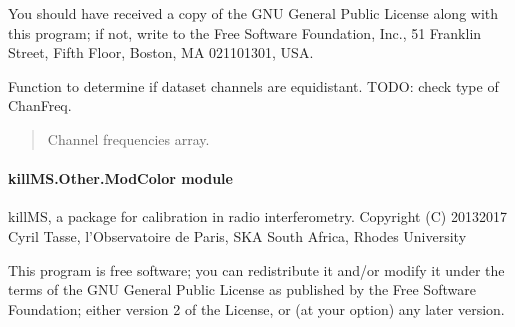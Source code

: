 \documentclass[letterpaper,10pt,english]{sphinxmanual}
\begin{document}
\sphinxAtStartPar
You should have received a copy of the GNU General Public License
along with this program; if not, write to the Free Software
Foundation, Inc., 51 Franklin Street, Fifth Floor, Boston, MA  02110\sphinxhyphen{}1301, USA.

\begin{fulllineitems}
\label{\detokenize{api/killMS.Other:killMS.Other.ModChanEquidistant.IsChanEquidistant}}
\pysigstartsignatures
{}
\pysigstopsignatures
\sphinxAtStartPar
Function to determine if dataset channels are equidistant.
TODO: check type of ChanFreq.
\begin{quote}\begin{description}
\sphinxAtStartPar
{} \textendash{} Channel frequencies array.

\sphinxAtStartPar
{}

\end{description}\end{quote}

\end{fulllineitems}



\paragraph{killMS.Other.ModColor module}
\label{\detokenize{api/killMS.Other:module-killMS.Other.ModColor}}\label{\detokenize{api/killMS.Other:killms-other-modcolor-module}}
\sphinxAtStartPar
killMS, a package for calibration in radio interferometry.
Copyright (C) 2013\sphinxhyphen{}2017  Cyril Tasse, l’Observatoire de Paris,
SKA South Africa, Rhodes University

\sphinxAtStartPar
This program is free software; you can redistribute it and/or
modify it under the terms of the GNU General Public License
as published by the Free Software Foundation; either version 2
of the License, or (at your option) any later version.
\end{document}

